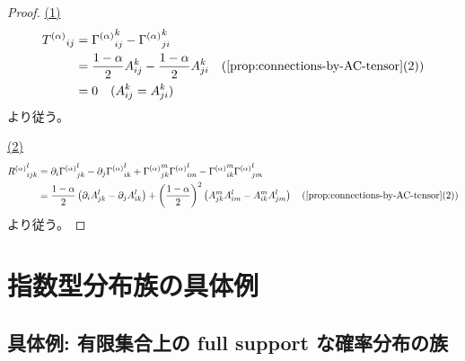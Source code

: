 \documentclass[report]{jlreq}
\begin{document}
\begin{proof}
    \uline{(1)} \quad
    \begin{alignat}{1}
        {T^{(\alpha)}}_{ij}
            &=
                {\Gamma^{(\alpha)}}_{ij}^k
                - {\Gamma^{(\alpha)}}_{ji}^k
                \\
            &=
                \frac{1 - \alpha}{2} A_{ij}^k
                - \frac{1 - \alpha}{2} A_{ji}^k
                \quad
                (\cref{prop:connections-by-AC-tensor} (2))
                \\
            &=
                0
                \quad
                (\text{$A_{ij}^k = A_{ji}^k$})
    \end{alignat}
    より従う。

    \uline{(2)} \quad
    \begin{alignat}{1}
        {R^{(\alpha)}}_{ijk}^l
            &=
                \del_i {\Gamma^{(\alpha)}}_{jk}^l
                - \del_j {\Gamma^{(\alpha)}}_{ik}^l
                + {\Gamma^{(\alpha)}}_{jk}^m
                    {\Gamma^{(\alpha)}}_{im}^l
                - {\Gamma^{(\alpha)}}_{ik}^m
                    {\Gamma^{(\alpha)}}_{jm}^l
                \\
            &=
                \frac{1 - \alpha}{2}
                \myparen{
                    \del_i A_{jk}^l
                    - \del_j A_{ik}^l
                }
                + \myparen{\frac{1 - \alpha}{2}}^2
                \myparen{
                    A_{jk}^m A_{im}^l
                    - A_{ik}^m A_{jm}^l
                }
                \quad
                (\cref{prop:connections-by-AC-tensor} (2))
    \end{alignat}
    より従う。
\end{proof}


%
\section{指数型分布族の具体例}

%
\subsection{具体例: 有限集合上の full support な確率分布の族}
\end{document}
